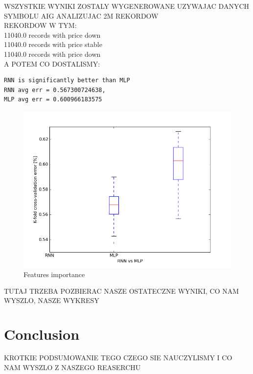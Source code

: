 \documentclass[twoside]{article}
\begin{document}
\begin{multicols}{2}
WSZYSTKIE WYNIKI ZOSTALY WYGENEROWANE UZYWAJAC DANYCH SYMBOLU AIG ANALIZUJAC 2M REKORDOW \\
 REKORDOW W TYM: \\
11040.0 records with price down \\
11040.0 records with price stable \\
11040.0 records with price down \\

A POTEM CO DOSTALISMY: \\
\newline
\begin{lstlisting}[caption={RNN vs MLP with 200 epochs and 20 crossvalidation steps output:}]
RNN is significantly better than MLP
RNN avg err = 0.567300724638, 
MLP avg err = 0.600966183575
\end{lstlisting}

\begin{figure}[H]
\centering
\includegraphics[scale=0.4]{../results/rnn_vs_mlp_200iters_20cross}
\caption{Features importance}
\label{ref:rnn}
\end{figure} 

TUTAJ TRZEBA POZBIERAC NASZE OSTATECZNE WYNIKI, CO NAM WYSZLO, NASZE WYKRESY

\section{Conclusion}

KROTKIE PODSUMOWANIE TEGO CZEGO SIE NAUCZYLISMY I CO NAM WYSZLO Z NASZEGO REASERCHU


\end{multicols}
\end{document}
